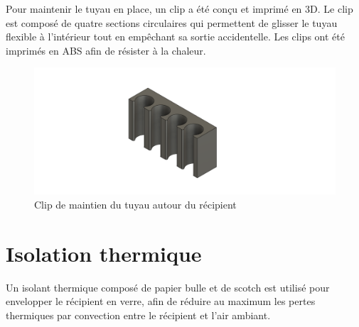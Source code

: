 Pour maintenir le tuyau en place, un clip a été conçu et imprimé en 3D.  
Le clip est composé de quatre sections circulaires qui permettent de glisser le tuyau flexible à l’intérieur tout en empêchant sa sortie accidentelle.  
Les clips ont été imprimés en ABS afin de résister à la chaleur.

\begin{figure}[H]
    \centering
    \includegraphics[width=\textwidth]{assets/figures/ATACHE TUBE V2.png}
    \caption{Clip de maintien du tuyau autour du récipient}
    \label{fig:Clip_tuyau}
\end{figure}

\section{Isolation thermique}

Un isolant thermique composé de papier bulle et de scotch est utilisé pour envelopper le récipient en verre, afin de réduire au maximum les pertes thermiques par convection entre le récipient et l’air ambiant.


